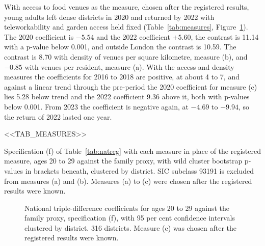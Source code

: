 \documentclass[11pt,a4paper]{article}
\newcommand{\tabnote}[1]{\par\smallskip\parbox{\linewidth}{\footnotesize #1}}
\begin{document}
With access to food venues as the measure, chosen after the registered results, young adults left dense districts in 2020 and returned by 2022 with teleworkability and garden access held fixed (Table~\ref{tab:measures}, Figure~\ref{fig:national}). The 2020 coefficient is $-5.54$ and the 2022 coefficient $+5.60$, the contrast is 11.14 with a p-value below 0.001, and outside London the contrast is 10.59. The contrast is 8.70 with density of venues per square kilometre, measure (b), and $-0.85$ with venues per resident, measure (a). With the access and density measures the coefficients for 2016 to 2018 are positive, at about 4 to 7, and against a linear trend through the pre-period the 2020 coefficient for measure (c) lies 5.28 below trend and the 2022 coefficient 9.36 above it, both with p-values below 0.001. From 2023 the coefficient is negative again, at $-4.69$ to $-9.94$, so the return of 2022 lasted one year.

\begin{table}[htbp]
\centering
\caption{Measures of density in the national triple difference}\label{tab:measures}
\small
<<TAB_MEASURES>>
\tabnote{Specification (f) of Table~\ref{tab:natreg} with each measure in place of the registered measure, ages 20 to 29 against the family proxy, with wild cluster bootstrap p-values in brackets beneath, clustered by district. SIC subclass 93191 is excluded from measures (a) and (b). Measures (a) to (c) were chosen after the registered results were known.}
\end{table}

\begin{figure}[htbp]
\centering
{}
\caption{National triple-difference coefficients for ages 20 to 29 against the family proxy, specification (f), with 95 per cent confidence intervals clustered by district. 316 districts. Measure (c) was chosen after the registered results were known.}\label{fig:national}
\end{figure}
\end{document}
